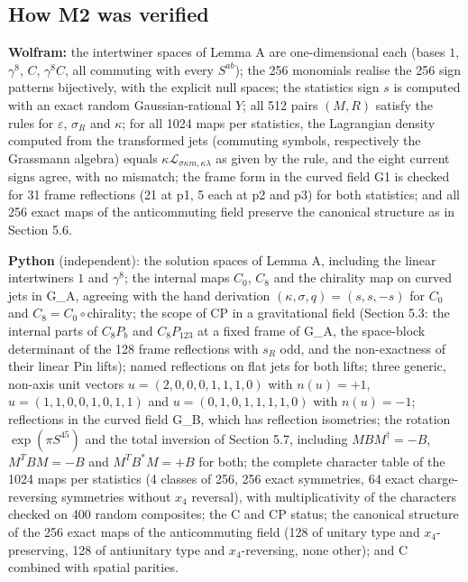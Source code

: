 \documentclass[11pt]{article}
\begin{document}
\subsection{How M2 was verified}

\textbf{Wolfram:} the intertwiner spaces of Lemma A are one-dimensional each (bases $1$, $\gamma^8$, $C$, $\gamma^8C$, all commuting with every $S^{ab}$); the 256 monomials realise the 256 sign patterns bijectively, with the explicit null spaces; the statistics sign $s$ is computed with an exact random Gaussian-rational $Y$; all 512 pairs $(M,R)$ satisfy the rules for $\varepsilon$, $\sigma_R$ and $\kappa$; for all 1024 maps per statistics, the Lagrangian density computed from the transformed jets (commuting symbols, respectively the Grassmann algebra) equals $\kappa\mathcal L_{\sigma\kappa m,\kappa\lambda}$ as given by the rule, and the eight current signs agree, with no mismatch; the frame form in the curved field G1 is checked for 31 frame reflections (21 at p1, 5 each at p2 and p3) for both statistics; and all 256 exact maps of the anticommuting field preserve the canonical structure as in Section 5.6.

\textbf{Python} (independent): the solution spaces of Lemma A, including the linear intertwiners $1$ and $\gamma^8$; the internal maps $C_0$, $C_8$ and the chirality map on curved jets in G\_A, agreeing with the hand derivation $(\kappa,\sigma,q)=(s,s,-s)$ for $C_0$ and $C_8=C_0\circ$chirality; the scope of CP in a gravitational field (Section 5.3: the internal parts of $C_8P_b$ and $C_8P_{123}$ at a fixed frame of G\_A, the space-block determinant of the 128 frame reflections with $s_R$ odd, and the non-exactness of their linear Pin lifts); named reflections on flat jets for both lifts; three generic, non-axis unit vectors $u=(2,0,0,0,1,1,1,0)$ with $n(u)=+1$, $u=(1,1,0,0,1,0,1,1)$ and $u=(0,1,0,1,1,1,1,0)$ with $n(u)=-1$; reflections in the curved field G\_B, which has reflection isometries; the rotation $\exp(\pi S^{45})$ and the total inversion of Section 5.7, including $MBM^\dagger=-B$, $M^TBM=-B$ and $M^TB^\ast M=+B$ for both; the complete character table of the 1024 maps per statistics (4 classes of 256, 256 exact symmetries, 64 exact charge-reversing symmetries without $x_4$ reversal), with multiplicativity of the characters checked on 400 random composites; the C and CP status; the canonical structure of the 256 exact maps of the anticommuting field (128 of unitary type and $x_4$-preserving, 128 of antiunitary type and $x_4$-reversing, none other); and C combined with spatial parities.
\end{document}
